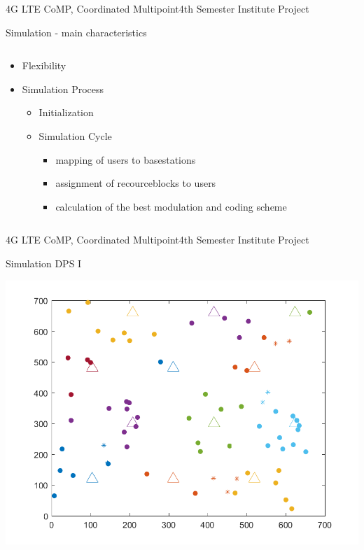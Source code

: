 \documentclass[xcolor={cmyk}]{beamer}
\begin{document}
 \begin{frame}{4G LTE CoMP, Coordinated Multipoint}{4th Semester Institute Project}
	 \begin{block}{Simulation - main characteristics}
	 	\begin{columns}
			\begin{column}{.9\textwidth}
				\begin{itemize}
					\item Flexibility
					\item Simulation Process
					\begin{itemize}
						\item Initialization
						\item Simulation Cycle
						\begin{itemize}
							\item mapping of users to basestations
							\item assignment of recourceblocks to users
							\item calculation of the best modulation and coding scheme
					 	\end{itemize}
					 \end{itemize}
					
				 \end{itemize}
			\end{column}
		\end{columns}
	 \end{block}
 \end{frame}
 
 \begin{frame}{4G LTE CoMP, Coordinated Multipoint}{4th Semester Institute Project}
 \begin{block}{Simulation DPS I}
 
 \includegraphics[width=\linewidth,height=\textheight,keepaspectratio]{MapPlotDPS1.png}
 \end{block}
 \end{frame}
 
\end{document}
